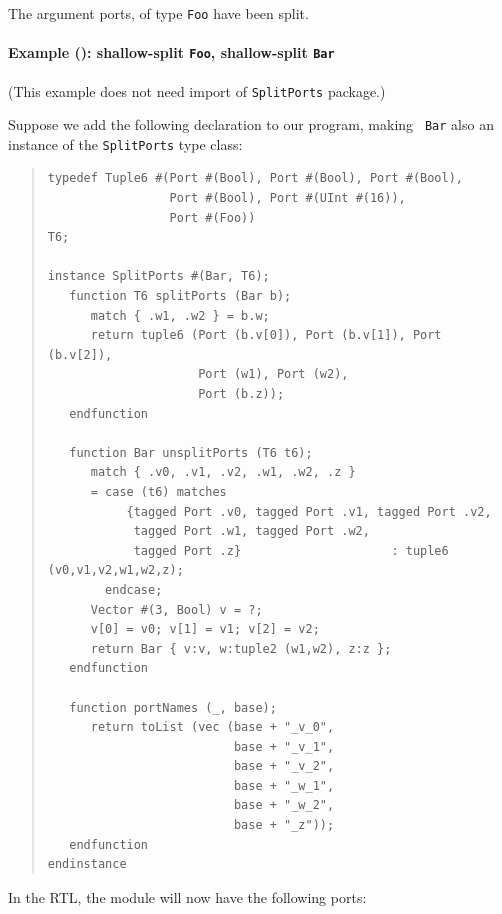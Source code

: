 The argument ports, of type {\tt Foo} have been split.


\paragraph{Example (\BSV): shallow-split {\tt Foo}, shallow-split {\tt Bar}}

\label{sec:splitports_examples_BSV_Foo_Shallow_Bar_Shallow}

\hspace*{1em}

{\footnotesize (This example does not need import of {\tt SplitPorts} package.)}

Suppose we add the following declaration to our program, making {\tt
  Bar} also an instance of the {\tt SplitPorts} type class:

\begin{quote}
\begin{verbatim}
typedef Tuple6 #(Port #(Bool), Port #(Bool), Port #(Bool),
                 Port #(Bool), Port #(UInt #(16)),
                 Port #(Foo))                                 T6;

instance SplitPorts #(Bar, T6);
   function T6 splitPorts (Bar b);
      match { .w1, .w2 } = b.w;
      return tuple6 (Port (b.v[0]), Port (b.v[1]), Port (b.v[2]),
                     Port (w1), Port (w2),
                     Port (b.z));
   endfunction

   function Bar unsplitPorts (T6 t6);
      match { .v0, .v1, .v2, .w1, .w2, .z }
      = case (t6) matches
           {tagged Port .v0, tagged Port .v1, tagged Port .v2,
            tagged Port .w1, tagged Port .w2,
            tagged Port .z}                     : tuple6 (v0,v1,v2,w1,w2,z);
        endcase;
      Vector #(3, Bool) v = ?;
      v[0] = v0; v[1] = v1; v[2] = v2;
      return Bar { v:v, w:tuple2 (w1,w2), z:z };
   endfunction

   function portNames (_, base);
      return toList (vec (base + "_v_0",
                          base + "_v_1",
                          base + "_v_2",
                          base + "_w_1",
                          base + "_w_2",
                          base + "_z"));
   endfunction
endinstance
\end{verbatim}
\end{quote}

In the RTL, the module will now have the following ports:

